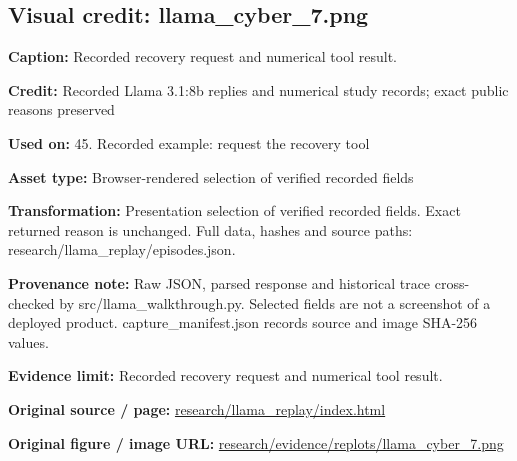 \documentclass[10pt,letterpaper]{article}
\begin{document}
\subsection*{Visual credit: llama\_cyber\_7.png}
\textbf{Caption:} Recorded recovery request and numerical tool result.\par
\textbf{Credit:} Recorded Llama 3.1:8b replies and numerical study records; exact public reasons preserved\par
\textbf{Used on:} 45. Recorded example: request the recovery tool\par
\textbf{Asset type:} Browser-rendered selection of verified recorded fields\par
\textbf{Transformation:} Presentation selection of verified recorded fields. Exact returned reason is unchanged. Full data, hashes and source paths: research/llama\_replay/episodes.json.\par
\textbf{Provenance note:} Raw JSON, parsed response and historical trace cross-checked by src/llama\_walkthrough.py. Selected fields are not a screenshot of a deployed product. capture\_manifest.json records source and image SHA-256 values.\par
\textbf{Evidence limit:} Recorded recovery request and numerical tool result.\par
\textbf{Original source / page:} \href{../research/llama_replay/index.html}{\small\ttfamily research/\allowbreak{}llama\_\allowbreak{}replay/\allowbreak{}index.\allowbreak{}html}\par
\textbf{Original figure / image URL:} \href{../research/evidence/replots/llama_cyber_7.png}{\small\ttfamily research/\allowbreak{}evidence/\allowbreak{}replots/\allowbreak{}llama\_\allowbreak{}cyber\_\allowbreak{}7.\allowbreak{}png}\par
\par\medskip
\end{document}
